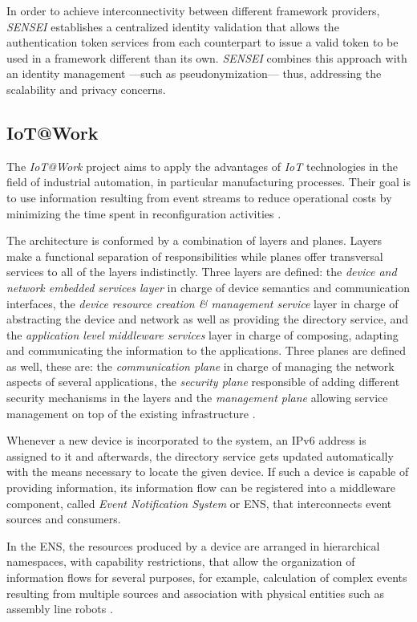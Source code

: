 \documentclass[journal]{IEEEtran}
\begin{document}
  In order to achieve interconnectivity between different framework providers, \emph{SENSEI} establishes a centralized identity validation that allows the authentication token services from each counterpart to issue a valid token to be used in a framework different than its own. \emph{SENSEI} combines this approach with an identity management ---such as pseudonymization--- thus, addressing the scalability and privacy concerns. 

  \subsection{IoT@Work}

  The \emph{IoT@Work} project aims to apply the advantages of \emph{IoT} technologies in the field of industrial automation, in particular manufacturing processes. Their goal is to use information resulting from event streams to reduce operational costs by minimizing the time spent in reconfiguration activities \cite{IoTWorkWeb}.

  The architecture is conformed by a combination of layers and planes. Layers make a functional separation of responsibilities while planes offer transversal services to all of the layers indistinctly. Three layers are defined: the \emph{device and network embedded services layer} in charge of device semantics and communication interfaces, the \emph{device resource creation \& management service} layer in charge of abstracting the device and network as well as providing the directory service, and the \emph{application level middleware services} layer in charge of composing, adapting and communicating the information to the applications. Three planes are defined as well, these are: the \emph{communication plane} in charge of managing the network aspects of several applications, the \emph{security plane} responsible of adding different security mechanisms in the layers and the \emph{management plane} allowing service management on top of the existing infrastructure \cite{Rotondi2013}.

  Whenever a new device is incorporated to the system, an IPv6 address is assigned to it and afterwards, the directory service gets updated automatically with the means necessary to locate the given device. If such a device is capable of providing information, its information flow can be registered into a middleware component, called \emph{Event Notification System} or ENS, that interconnects event sources and consumers. 

  In the ENS, the resources produced by a device are arranged in hierarchical namespaces, with capability restrictions, that allow the organization of information flows for several purposes, for example, calculation of complex events resulting from multiple sources and association with physical entities such as assembly line robots \cite{Trsek2013}.
\end{document}
